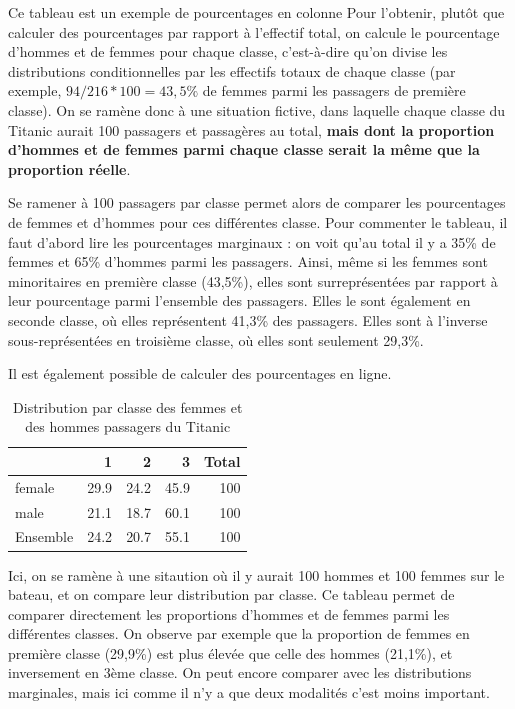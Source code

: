 \documentclass[
]{book}
\begin{document}
Ce tableau est un exemple de pourcentages en colonne Pour l'obtenir, plutôt que calculer des pourcentages par rapport à l'effectif total, on calcule le pourcentage d'hommes et de femmes pour chaque classe, c'est-à-dire qu'on divise les distributions conditionnelles par les effectifs totaux de chaque classe (par exemple, \(94/216*100 = 43,5 \%\) de femmes parmi les passagers de première classe). On se ramène donc à une situation fictive, dans laquelle chaque classe du Titanic aurait 100 passagers et passagères au total, \textbf{mais dont la proportion d'hommes et de femmes parmi chaque classe serait la même que la proportion réelle}.

Se ramener à 100 passagers par classe permet alors de comparer les pourcentages de femmes et d'hommes pour ces différentes classe. Pour commenter le tableau, il faut d'abord lire les pourcentages marginaux : on voit qu'au total il y a 35\% de femmes et 65\% d'hommes parmi les passagers. Ainsi, même si les femmes sont minoritaires en première classe (43,5\%), elles sont surreprésentées par rapport à leur pourcentage parmi l'ensemble des passagers. Elles le sont également en seconde classe, où elles représentent 41,3\% des passagers. Elles sont à l'inverse sous-représentées en troisième classe, où elles sont seulement 29,3\%.

Il est également possible de calculer des pourcentages en ligne.

\begin{table}

\caption{\label{tab:unnamed-chunk-19}Distribution par classe des femmes et des hommes passagers du Titanic}
\centering
\begin{tabular}[t]{l|r|r|r|r}
\hline
  & 1 & 2 & 3 & Total\\
\hline
female & 29.9 & 24.2 & 45.9 & 100\\
\hline
male & 21.1 & 18.7 & 60.1 & 100\\
\hline
Ensemble & 24.2 & 20.7 & 55.1 & 100\\
\hline
\end{tabular}
\end{table}

Ici, on se ramène à une sitaution où il y aurait 100 hommes et 100 femmes sur le bateau, et on compare leur distribution par classe. Ce tableau permet de comparer directement les proportions d'hommes et de femmes parmi les différentes classes. On observe par exemple que la proportion de femmes en première classe (29,9\%) est plus élevée que celle des hommes (21,1\%), et inversement en 3ème classe. On peut encore comparer avec les distributions marginales, mais ici comme il n'y a que deux modalités c'est moins important.
\end{document}

